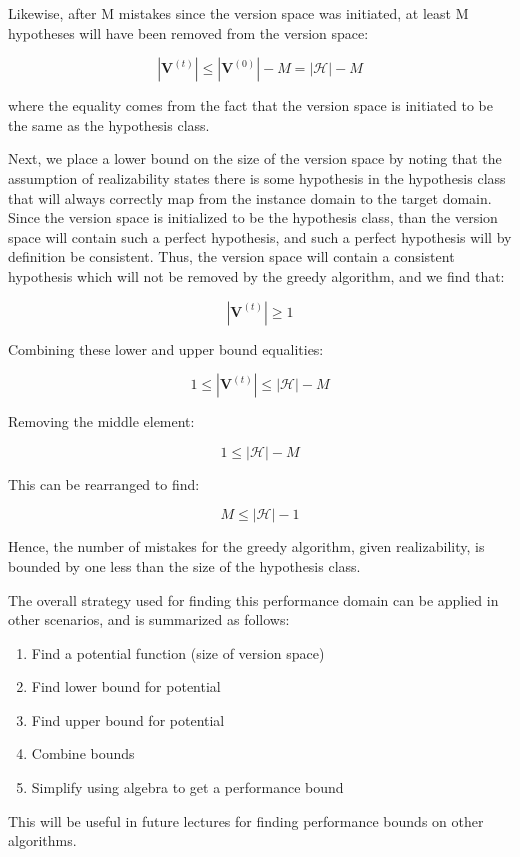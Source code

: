\documentclass[11pt]{article}
\begin{document}
Likewise, after M mistakes since the version space was initiated, at least M hypotheses will have been removed from the version space:

$$|\textbf{V}^{(t)}| \leq |\textbf{V}^{(0)}| - M = |\mathcal{H}| - M$$

where the equality comes from the fact that the version space is initiated to be the same as the hypothesis class. 

Next, we place a lower bound on the size of the version space by noting that the assumption of realizability states there is some hypothesis in the hypothesis class that will always correctly map from the instance domain to the target domain. Since the version space is initialized to be the hypothesis class, than the version space will contain such a perfect hypothesis, and such a perfect hypothesis will by definition be consistent. Thus, the version space will contain a consistent hypothesis which will not be removed by the greedy algorithm, and we find that:

$$|\textbf{V}^{(t)}| \geq 1$$

Combining these lower and upper bound equalities:

$$1 \leq |\textbf{V}^{(t)}| \leq  |\mathcal{H}| - M$$

Removing the middle element:

$$1 \leq |\mathcal{H}| - M$$

This can be rearranged to find:

$$M \leq |\mathcal{H}| - 1$$

Hence, the number of mistakes for the greedy algorithm, given realizability, is bounded by one less than the size of the hypothesis class.

The overall strategy used for finding this performance domain can be applied in other scenarios, and is summarized as follows:

\begin{enumerate}
    \item Find a potential function (size of version space)
    \item Find lower bound for potential
    \item Find upper bound for potential
    \item Combine bounds
    \item Simplify using algebra to get a performance bound
\end{enumerate}

This will be useful in future lectures for finding performance bounds on other algorithms. 
\end{document}
